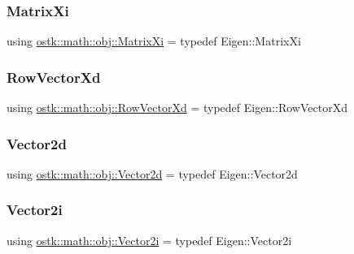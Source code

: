 \subsubsection{\texorpdfstring{Matrix\+Xi}{MatrixXi}}
{\footnotesize\ttfamily using \hyperlink{namespaceostk_1_1math_1_1obj_aca824852c53eba10924e5f0fb80cbb87}{ostk\+::math\+::obj\+::\+Matrix\+Xi} = typedef Eigen\+::\+Matrix\+Xi}

\mbox{\label{namespaceostk_1_1math_1_1obj_a008452f31d2d89206382562dc0180574}} 
\subsubsection{\texorpdfstring{Row\+Vector\+Xd}{RowVectorXd}}
{\footnotesize\ttfamily using \hyperlink{namespaceostk_1_1math_1_1obj_a008452f31d2d89206382562dc0180574}{ostk\+::math\+::obj\+::\+Row\+Vector\+Xd} = typedef Eigen\+::\+Row\+Vector\+Xd}

\mbox{\label{namespaceostk_1_1math_1_1obj_a5ce374bc225ecfb685da4fed9aa67e6e}} 
\subsubsection{\texorpdfstring{Vector2d}{Vector2d}}
{\footnotesize\ttfamily using \hyperlink{namespaceostk_1_1math_1_1obj_a5ce374bc225ecfb685da4fed9aa67e6e}{ostk\+::math\+::obj\+::\+Vector2d} = typedef Eigen\+::\+Vector2d}

\mbox{\label{namespaceostk_1_1math_1_1obj_af19f95215c05a66d8f991863fb0e062c}} 
\subsubsection{\texorpdfstring{Vector2i}{Vector2i}}
{\footnotesize\ttfamily using \hyperlink{namespaceostk_1_1math_1_1obj_af19f95215c05a66d8f991863fb0e062c}{ostk\+::math\+::obj\+::\+Vector2i} = typedef Eigen\+::\+Vector2i}

